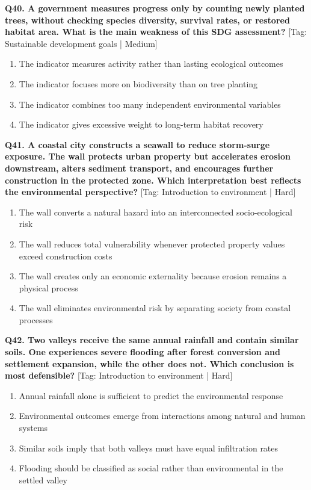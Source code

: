 \noindent\textbf{Q40. A government measures progress only by counting newly planted trees, without checking species diversity, survival rates, or restored habitat area. What is the main weakness of this SDG assessment?} \hfill [Tag: Sustainable development goals | Medium]
\begin{enumerate}[label=(\alph*),topsep=2pt,itemsep=1pt,partopsep=0pt,parsep=0pt]
    \item {The indicator measures activity rather than lasting ecological outcomes}
    \item {The indicator focuses more on biodiversity than on tree planting}
    \item {The indicator combines too many independent environmental variables}
    \item {The indicator gives excessive weight to long-term habitat recovery}
\end{enumerate}
\vspace{2mm}

\noindent\textbf{Q41. A coastal city constructs a seawall to reduce storm-surge exposure. The wall protects urban property but accelerates erosion downstream, alters sediment transport, and encourages further construction in the protected zone. Which interpretation best reflects the environmental perspective?} \hfill [Tag: Introduction to environment | Hard]
\begin{enumerate}[label=(\alph*),topsep=2pt,itemsep=1pt,partopsep=0pt,parsep=0pt]
    \item {The wall converts a natural hazard into an interconnected socio-ecological risk}
    \item {The wall reduces total vulnerability whenever protected property values exceed construction costs}
    \item {The wall creates only an economic externality because erosion remains a physical process}
    \item {The wall eliminates environmental risk by separating society from coastal processes}
\end{enumerate}
\vspace{2mm}

\noindent\textbf{Q42. Two valleys receive the same annual rainfall and contain similar soils. One experiences severe flooding after forest conversion and settlement expansion, while the other does not. Which conclusion is most defensible?} \hfill [Tag: Introduction to environment | Hard]
\begin{enumerate}[label=(\alph*),topsep=2pt,itemsep=1pt,partopsep=0pt,parsep=0pt]
    \item {Annual rainfall alone is sufficient to predict the environmental response}
    \item {Environmental outcomes emerge from interactions among natural and human systems}
    \item {Similar soils imply that both valleys must have equal infiltration rates}
    \item {Flooding should be classified as social rather than environmental in the settled valley}
\end{enumerate}
\vspace{2mm}


